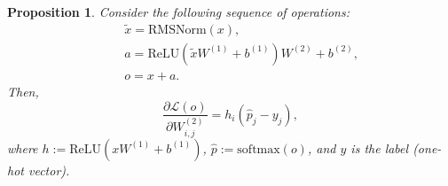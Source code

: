 \documentclass{article}
\newtheorem{proposition}{Proposition}
\begin{document}
\begin{proposition}
Consider the following sequence of operations:
\begin{align*}
    & \quad \tilde{x} = \mathrm{RMSNorm}(x), \\
    & \quad a = \mathrm{ReLU}(\tilde{x} W^{(1)} + b^{(1)})W^{(2)} + b^{(2)}, \\
    & \quad o = x + a.
\end{align*}
Then,
\begin{equation}
    \frac{\partial \mathcal{L}(o)}{\partial W_{i,j}^{(2)}} = h_{i} (\hat{p}_{j} - y_{j}),  
\end{equation}
where $h := \mathrm{ReLU}\left(x W^{(1)} + b^{(1)}\right)$, $\hat{p} := \mathrm{softmax}(o)$, and $y$ is the label (one-hot vector).
\end{proposition}
\end{document}
